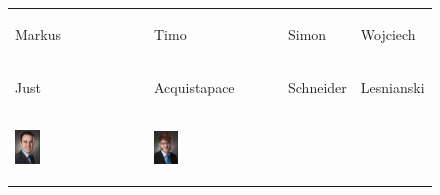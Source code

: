 \begin{table}[h]
\renewcommand\arraystretch{1}
\begin{tabular}{p{}p{}p{}p{}}
\begin{center}Markus\end{center} & 
\begin{center}Timo\end{center} & 
\begin{center}Simon\end{center} & 
\begin{center}Wojciech\end{center}
\\
\vspace{-1.2cm}\begin{center}Just\end{center} & 
\vspace{-1.2cm}\begin{center}Acquistapace\end{center} & 
\vspace{-1.2cm}\begin{center}Schneider\end{center} & 
\vspace{-1.2cm}\begin{center}Lesnianski\end{center}
\\
\vspace{-1cm}\begin{center}\includegraphics[width=0.2\textwidth]{res/intro/Markus.png}\end{center}
& 
\vspace{-1cm}\begin{center}\includegraphics[width=0.2\textwidth]{res/intro/Timo.png}\end{center}

\end{tabular}
\end{table}
